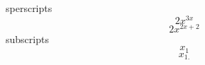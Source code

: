 \documentclass[12pt]{article}
\begin{document}
sperscripts $$2x^{3x}$$
$$2x^{2x+2}$$
subscripts
$$ x_1$$
$$ x_{1.}$$
\end{document}
